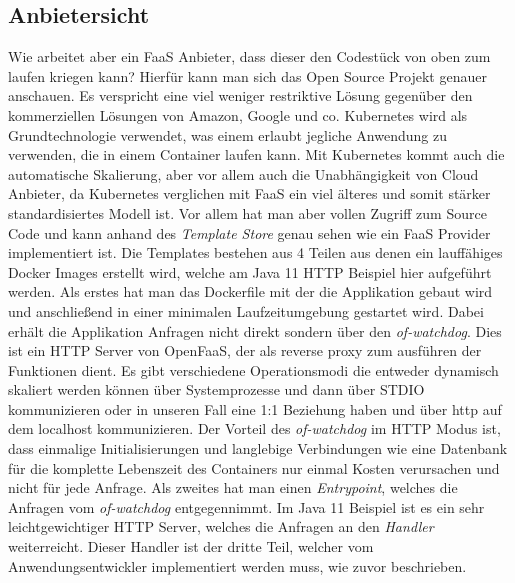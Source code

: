 \documentclass[12pt, a4paper]{article}
\begin{document}
\subsection{Anbietersicht}
Wie arbeitet aber ein \ac{FaaS} Anbieter, dass dieser den Codestück von oben zum laufen kriegen kann?
\newline
Hierfür kann man sich das Open Source Projekt \cite[OpenFaaS]{openfaas_github} genauer anschauen.
Es verspricht eine viel weniger restriktive Lösung gegenüber den kommerziellen Lösungen von Amazon, Google und co.
Kubernetes wird als Grundtechnologie verwendet, was einem erlaubt jegliche Anwendung zu verwenden, die in einem Container laufen kann.
Mit Kubernetes kommt auch die automatische Skalierung, aber vor allem auch die Unabhängigkeit von Cloud Anbieter, da Kubernetes verglichen mit \ac{FaaS} ein viel älteres und somit stärker standardisiertes Modell ist.
\newline
Vor allem hat man aber vollen Zugriff zum Source Code und kann anhand des \emph{Template Store}\cite{openfaas_templateStore} genau sehen wie ein \ac{FaaS} Provider implementiert ist.
Die Templates bestehen aus 4 Teilen aus denen ein lauffähiges Docker Images erstellt wird, welche am Java 11 HTTP Beispiel \cite{openfaas_templateStore_java11} hier aufgeführt werden.
\newline
Als erstes hat man das Dockerfile mit der die Applikation gebaut wird und anschließend in einer minimalen Laufzeitumgebung gestartet wird.
\newline
Dabei erhält die Applikation Anfragen nicht direkt sondern über den \emph{of-watchdog}\cite{openfaas_ofWatchdog}.
Dies ist ein HTTP Server von OpenFaaS, der als reverse proxy zum ausführen der Funktionen dient.
Es gibt verschiedene Operationsmodi die entweder dynamisch skaliert werden können über Systemprozesse und dann über STDIO kommunizieren oder in unseren Fall eine 1:1 Beziehung haben und über http auf dem localhost kommunizieren.
Der Vorteil des \emph{of-watchdog} im HTTP Modus ist, dass einmalige Initialisierungen und langlebige Verbindungen wie eine Datenbank für die komplette Lebenszeit des Containers nur einmal Kosten verursachen und nicht für jede Anfrage.
\newline
Als zweites hat man einen \emph{Entrypoint}, welches die Anfragen vom \emph{of-watchdog} entgegennimmt. Im Java 11 Beispiel ist es ein sehr leichtgewichtiger HTTP Server, welches die Anfragen an den \emph{Handler} weiterreicht.
\newline
Dieser Handler ist der dritte Teil, welcher vom Anwendungsentwickler implementiert werden muss, wie zuvor beschrieben.
\end{document}
